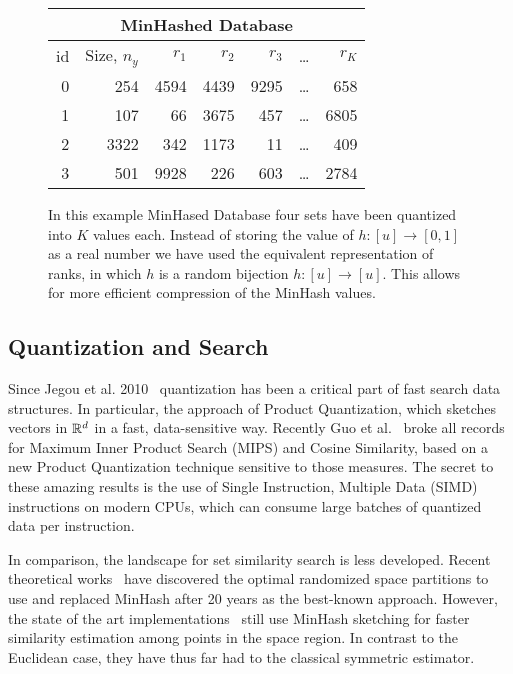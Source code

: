 \begin{figure}
\centering
 \begin{tabular}{|r|r| r r r r r|} 
 \hline
     \multicolumn{7}{|c|}{MinHashed Database} \\
 \hline
 id & Size, $n_y$  & $r_1$ & $r_2$ & $r_3$ & \dots & $r_K$ \\
 \hline
 0 & 254 & 4594 & 4439 & 9295 & \dots & 658  \\
 1 & 107 & 66 & 3675 & 457 &     \dots & 6805  \\
 2 & 3322 & 342 & 1173 & 11 &    \dots & 409  \\
 3 & 501 & 9928 & 226 & 603 &    \dots & 2784  \\
  \hline
 \end{tabular}
 \caption{In this example MinHased Database four sets have been quantized into $K$ values each.
    Instead of storing the value of $h:[u]\to[0,1]$ as a real number we have used the equivalent representation of ranks, in which $h$ is a random bijection $h:[u]\to[u]$.
    This allows for more efficient compression of the MinHash values.
 }
 \label{tab:minhash-example}
\end{figure}





\subsection{Quantization and Search}

Since Jegou et al. 2010~\cite{jegou2010product} quantization has been a critical part of fast search data structures.
In particular, the approach of Product Quantization, which sketches vectors in $\mathbb{R}^d$ in a fast, data-sensitive way.
Recently Guo et al.~\cite{guo2020accelerating} broke all records~\cite{aumuller2017ann} for Maximum Inner Product Search (MIPS) and Cosine Similarity, based on a new Product Quantization technique sensitive to those measures.
The secret to these amazing results is the use of Single Instruction, Multiple Data (SIMD) instructions on modern CPUs, which can consume large batches of quantized data per instruction.

In comparison, the landscape for set similarity search is less developed.
Recent theoretical works~\cite{christiani2017set, DBLP:conf/focs/AhleK20} have discovered the optimal randomized space partitions to use and replaced MinHash after 20 years as the best-known approach.
However, the state of the art implementations~\cite{christiani2018scalable} still use MinHash sketching for faster similarity estimation among points in the space region.
In contrast to the Euclidean case, they have thus far had to the classical symmetric estimator.



